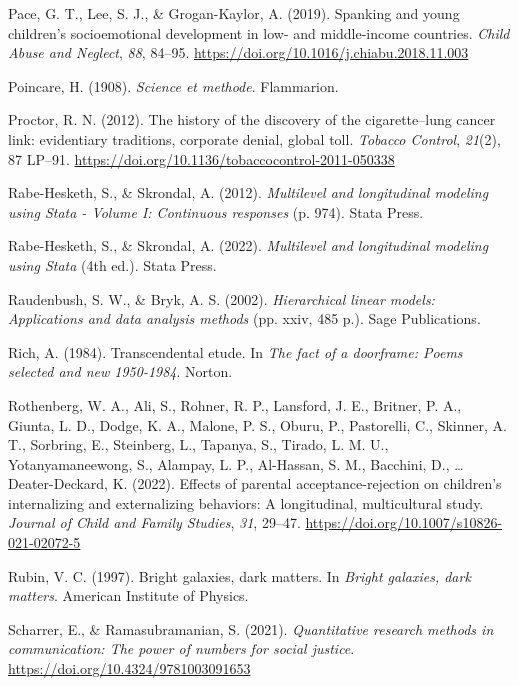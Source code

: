 \documentclass[
  letterpaper,
  DIV=11,
  numbers=noendperiod]{scrreprt}
\newlength{\cslhangindent}
\newenvironment{CSLReferences}[2] %
 {\begin{list}{}{%
  \setlength{\itemindent}{0pt}
  \setlength{\leftmargin}{0pt}
  \setlength{\parsep}{0pt}
  \ifodd #1
   \setlength{\leftmargin}{\cslhangindent}
   \setlength{\itemindent}{-1\cslhangindent}
  \fi
  \setlength{\itemsep}{#2\baselineskip}}}
 {\end{list}}
\begin{document}
\begin{CSLReferences}{1}{0}
Pace, G. T., Lee, S. J., \& Grogan-Kaylor, A. (2019). {Spanking and
young children's socioemotional development in low- and middle-income
countries}. \emph{Child Abuse and Neglect}, \emph{88}, 84--95.
\url{https://doi.org/10.1016/j.chiabu.2018.11.003}

Poincare, H. (1908). \emph{Science et methode}. Flammarion.

Proctor, R. N. (2012). {The history of the discovery of the
cigarette--lung cancer link: evidentiary traditions, corporate denial,
global toll}. \emph{Tobacco Control}, \emph{21}(2), 87 LP--91.
\url{https://doi.org/10.1136/tobaccocontrol-2011-050338}

Rabe-Hesketh, S., \& Skrondal, A. (2012). \emph{Multilevel and
longitudinal modeling using {S}tata - {V}olume {I}: Continuous
responses} (p. 974). Stata Press.

Rabe-Hesketh, S., \& Skrondal, A. (2022). \emph{Multilevel and
longitudinal modeling using {S}tata} (4th ed.). Stata Press.

Raudenbush, S. W., \& Bryk, A. S. (2002). \emph{Hierarchical linear
models: Applications and data analysis methods} (pp. xxiv, 485 p.). Sage
Publications.

Rich, A. (1984). Transcendental etude. In \emph{The fact of a doorframe:
Poems selected and new 1950-1984}. Norton.

Rothenberg, W. A., Ali, S., Rohner, R. P., Lansford, J. E., Britner, P.
A., Giunta, L. D., Dodge, K. A., Malone, P. S., Oburu, P., Pastorelli,
C., Skinner, A. T., Sorbring, E., Steinberg, L., Tapanya, S., Tirado, L.
M. U., Yotanyamaneewong, S., Alampay, L. P., Al-Hassan, S. M., Bacchini,
D., \ldots{} Deater-Deckard, K. (2022). Effects of parental
acceptance-rejection on children's internalizing and externalizing
behaviors: A longitudinal, multicultural study. \emph{Journal of Child
and Family Studies}, \emph{31}, 29--47.
\url{https://doi.org/10.1007/s10826-021-02072-5}

Rubin, V. C. (1997). Bright galaxies, dark matters. In \emph{Bright
galaxies, dark matters}. American Institute of Physics.

Scharrer, E., \& Ramasubramanian, S. (2021). \emph{Quantitative research
methods in communication: The power of numbers for social justice}.
\url{https://doi.org/10.4324/9781003091653}


\end{CSLReferences}
\end{document}
